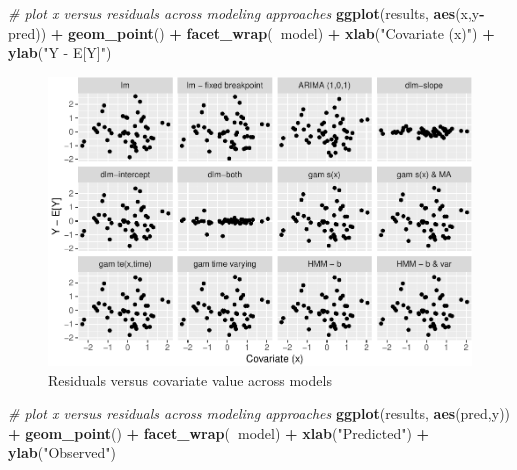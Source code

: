 \documentclass[]{article}
\newenvironment{Shaded}{\begin{snugshade}}{\end{snugshade}}
\newcommand{\CommentTok}[1]{\textcolor[rgb]{0.56,0.35,0.01}{\textit{#1}}}
\newcommand{\KeywordTok}[1]{\textcolor[rgb]{0.13,0.29,0.53}{\textbf{#1}}}
\newcommand{\NormalTok}[1]{#1}
\newcommand{\OperatorTok}[1]{\textcolor[rgb]{0.81,0.36,0.00}{\textbf{#1}}}
\newcommand{\StringTok}[1]{\textcolor[rgb]{0.31,0.60,0.02}{#1}}
\begin{document}
\begin{Shaded}
\begin{Highlighting}[]
\CommentTok{# plot x versus residuals across modeling approaches}
\KeywordTok{ggplot}\NormalTok{(results, }\KeywordTok{aes}\NormalTok{(x,y}\OperatorTok{-}\NormalTok{pred)) }\OperatorTok{+}\StringTok{ }\KeywordTok{geom_point}\NormalTok{() }\OperatorTok{+}\StringTok{ }
\StringTok{  }\KeywordTok{facet_wrap}\NormalTok{(}\OperatorTok{~}\NormalTok{model) }\OperatorTok{+}\StringTok{ }\KeywordTok{xlab}\NormalTok{(}\StringTok{"Covariate (x)"}\NormalTok{) }\OperatorTok{+}\StringTok{ }\KeywordTok{ylab}\NormalTok{(}\StringTok{"Y - E[Y]"}\NormalTok{)}
\end{Highlighting}
\end{Shaded}

\begin{figure}
\centering
\includegraphics{univariate-time-series-examples_files/figure-latex/unnamed-chunk-8-1.pdf}
\caption{Residuals versus covariate value across models}
\end{figure}

\begin{Shaded}
\begin{Highlighting}[]
\CommentTok{# plot x versus residuals across modeling approaches}
\KeywordTok{ggplot}\NormalTok{(results, }\KeywordTok{aes}\NormalTok{(pred,y)) }\OperatorTok{+}\StringTok{ }\KeywordTok{geom_point}\NormalTok{() }\OperatorTok{+}\StringTok{ }
\StringTok{  }\KeywordTok{facet_wrap}\NormalTok{(}\OperatorTok{~}\NormalTok{model) }\OperatorTok{+}\StringTok{ }\KeywordTok{xlab}\NormalTok{(}\StringTok{"Predicted"}\NormalTok{) }\OperatorTok{+}\StringTok{ }\KeywordTok{ylab}\NormalTok{(}\StringTok{"Observed"}\NormalTok{)}
\end{Highlighting}
\end{Shaded}
\end{document}
